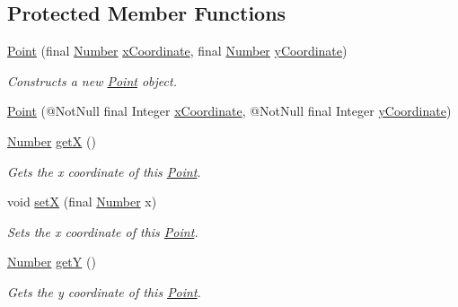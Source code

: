 \subsection*{Protected Member Functions}
\begin{DoxyCompactItemize}
\item 
\hyperlink{classcom_1_1aarrelaakso_1_1drawl_1_1_point_a1eb402d4971df738ea66227c7c12cb70}{Point} (final \hyperlink{interfacecom_1_1aarrelaakso_1_1drawl_1_1_number}{Number} \hyperlink{classcom_1_1aarrelaakso_1_1drawl_1_1_point_aa5144c5cca82c86f845bead6d4a51041}{x\+Coordinate}, final \hyperlink{interfacecom_1_1aarrelaakso_1_1drawl_1_1_number}{Number} \hyperlink{classcom_1_1aarrelaakso_1_1drawl_1_1_point_ab84afea50a66677c32ed2fd3100838c7}{y\+Coordinate})
\begin{DoxyCompactList}\small\item\em Constructs a new \hyperlink{classcom_1_1aarrelaakso_1_1drawl_1_1_point}{Point} object. \end{DoxyCompactList}\item 
\hyperlink{classcom_1_1aarrelaakso_1_1drawl_1_1_point_afb3376a5897946911a2230562fff07cf}{Point} (@Not\+Null final Integer \hyperlink{classcom_1_1aarrelaakso_1_1drawl_1_1_point_aa5144c5cca82c86f845bead6d4a51041}{x\+Coordinate}, @Not\+Null final Integer \hyperlink{classcom_1_1aarrelaakso_1_1drawl_1_1_point_ab84afea50a66677c32ed2fd3100838c7}{y\+Coordinate})
\item 
\hyperlink{interfacecom_1_1aarrelaakso_1_1drawl_1_1_number}{Number} \hyperlink{classcom_1_1aarrelaakso_1_1drawl_1_1_point_a39d39c84f2d05c9a2551cbc584c47bfc}{getX} ()
\begin{DoxyCompactList}\small\item\em Gets the x coordinate of this \hyperlink{classcom_1_1aarrelaakso_1_1drawl_1_1_point}{Point}. \end{DoxyCompactList}\item 
void \hyperlink{classcom_1_1aarrelaakso_1_1drawl_1_1_point_acf1cca24c7cf879f402e1b549a5e3864}{setX} (final \hyperlink{interfacecom_1_1aarrelaakso_1_1drawl_1_1_number}{Number} x)
\begin{DoxyCompactList}\small\item\em Sets the x coordinate of this \hyperlink{classcom_1_1aarrelaakso_1_1drawl_1_1_point}{Point}. \end{DoxyCompactList}\item 
\hyperlink{interfacecom_1_1aarrelaakso_1_1drawl_1_1_number}{Number} \hyperlink{classcom_1_1aarrelaakso_1_1drawl_1_1_point_a8247f55c36600e067be27a1586255767}{getY} ()
\begin{DoxyCompactList}\small\item\em Gets the y coordinate of this \hyperlink{classcom_1_1aarrelaakso_1_1drawl_1_1_point}{Point}. \end{DoxyCompactList}\end{DoxyCompactItemize}
